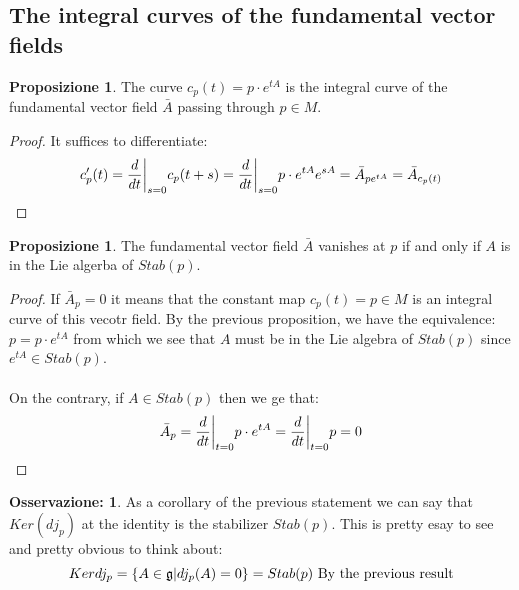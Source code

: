\documentclass[12pt,a4paper]{report}
\theoremstyle{definition}
\theoremstyle{Theorem}
\newtheorem{Prop}[Def]{Proposizione}
\theoremstyle{definition}
\theoremstyle{definition}
\theoremstyle{definition}
\newtheorem{Obs}[Def]{Osservazione:}
\begin{document}
		\subsection{The integral curves of the fundamental vector fields}
		\begin{Prop}
			The curve $c_p(t)=p\cdot e^{tA}$ is the integral curve of the fundamental vector field $\bar{A}$ passing through $p\in M$.
		\end{Prop}
		\begin{proof}
			It suffices to differentiate:
			$$c'_p(t)={d\over dt}\bigg|_{s=0}c_p(t+s)=
			{d\over dt}\bigg|_{s=0}p\cdot e^{tA}e^{sA}=\bar{A}_{pe^{tA}}=
			\bar{A}_{c_p(t)}$$
		\end{proof}
		\begin{Prop}
			The fundamental vector field $\bar{A}$ vanishes at $p$ if and only if $A$ is in the Lie algerba of $Stab(p)$.
		\end{Prop}
		\begin{proof}
			If $\bar{A}_p=0$ it means that the constant map $c_p(t)=p\in M$ is an integral curve of this vecotr field. By the previous proposition, we have the equivalence:
			$p=p\cdot e^{tA}$ from which we see that $A$ must be in the Lie algebra of $Stab(p)$ since $e^{tA}\in Stab(p)$.\\
			\\
			On the contrary, if $A\in Stab(p)$ then we ge that:
			$$\bar{A}_p={d\over dt}\bigg|_{t=0}p\cdot e^{tA}=
			{d\over dt}\bigg|_{t=0}p=0$$
		\end{proof}
		\begin{Obs}
			As a corollary of the previous statement we can say that $Ker(dj_p)$ at the identity is the stabilizer $Stab(p)$. This is pretty esay to see and pretty obvious to think about:
			$$Ker dj_p=\{A\in \mathfrak{g}|dj_p(A)=0\}=Stab(p)\hbox{ By the previous result}$$
		\end{Obs}
	
\end{document}
